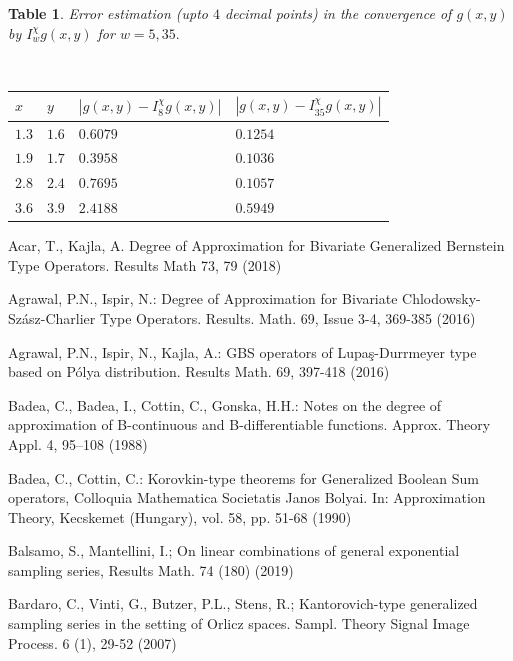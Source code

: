 \documentclass[12pt]{article}
\newtheorem{tb}{Table}
\begin{document}
{\begin{tb}\label{table2}\centering
 {\it Error estimation (upto $4$ decimal points) in the convergence of $g(x,y)$ by $I_{w}^{\chi}g(x,y)$ for $w=5,35.$}

$  $

\begin{tabular}{|l|l|l|l|}\hline
 $x$&$y$&$ |g(x,y) - I_{8}^{\chi}g(x,y)|$&$|g(x,y)-I_{35}^{\chi}g(x,y)|$\\
 \hline
 $1.3$&$1.6$ & $0.6079$ & $0.1254$\\
  \hline
 $1.9$&$1.7$ & $0.3958$ & $0.1036$ \\
  \hline
 $2.8$ &$2.4$ &$0.7695$ & $0.1057$\\
  \hline
 $3.6$ &$3.9$ & $2.4188$ & $0.5949$  \\
 \hline
             \end{tabular}
   \end{tb}


\begin{thebibliography}{99}

 Acar, T., Kajla, A. Degree of Approximation for Bivariate Generalized Bernstein Type Operators. Results Math 73, 79 (2018)

 Agrawal, P.N., Ispir, N.: Degree of Approximation for Bivariate Chlodowsky-Sz\'{a}sz-Charlier Type Operators. Results. Math. 69, Issue 3-4, 369-385 (2016)

 Agrawal, P.N., Ispir, N., Kajla, A.: GBS operators of Lupa\c{s}-Durrmeyer type based on P\'{o}lya distribution. Results Math. 69, 397-418 (2016)


 Badea, C., Badea, I., Cottin, C., Gonska, H.H.: Notes on the degree of approximation of B-continuous and B-differentiable functions. Approx. Theory Appl. 4, 95–108 (1988)


 Badea, C., Cottin, C.: Korovkin-type theorems for Generalized Boolean Sum operators, Colloquia Mathematica Societatis Janos Bolyai. In: Approximation Theory, Kecskemet (Hungary), vol. 58, pp. 51-68 (1990)

 Balsamo, S., Mantellini, I.; On linear combinations of general exponential sampling series, Results Math. 74 (180) (2019)

 Bardaro, C., Vinti, G., Butzer, P.L., Stens, R.; Kantorovich-type generalized sampling series in the setting of Orlicz spaces. Sampl. Theory Signal Image Process. 6 (1), 29-52 (2007)


\end{thebibliography}}
\end{document}
